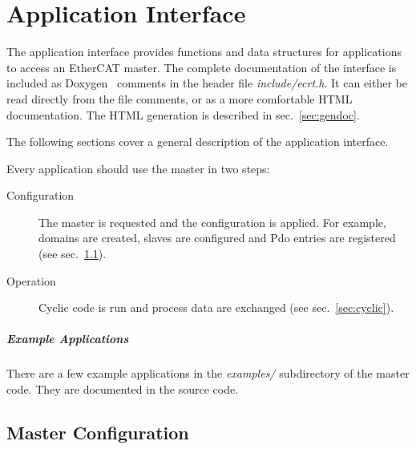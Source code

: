 \documentclass[a4paper,12pt,BCOR6mm,bibtotoc,idxtotoc]{scrbook}
\begin{document}

\chapter{Application Interface}
\label{chap:api}

%

The application interface provides functions and data structures for
applications to access an EtherCAT master. The complete documentation of the
interface is included as Doxygen~\cite{doxygen} comments in the header file
\textit{include/ecrt.h}. It can either be read directly from the file
comments, or as a more comfortable HTML documentation. The HTML generation is
described in sec.~\ref{sec:gendoc}.

The following sections cover a general description of the application
interface.

Every application should use the master in two steps:

\begin{description}

\item[Configuration] The master is requested and the configuration is applied.
For example, domains are created, slaves are configured and Pdo entries are
registered (see sec.~\ref{sec:masterconfig}).

\item[Operation] Cyclic code is run and process data are exchanged (see
sec.~\ref{sec:cyclic}).

\end{description}

\paragraph{Example Applications} There are a few
example applications in the \textit{examples/} subdirectory of the master
code. They are documented in the source code.


\section{Master Configuration}
\label{sec:masterconfig}
\end{document}
